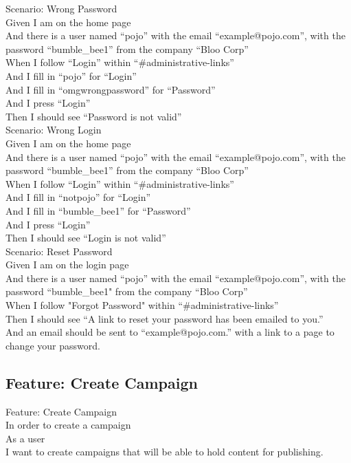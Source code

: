 \documentclass[12pt]{article}
\begin{document}
Scenario: Wrong Password \\
  Given I am on the home page \\
  And there is a user named ``pojo'' with the email ``example@pojo.com'', with the password ``bumble\_bee1'' from the company ``Bloo Corp'' \\
  When I follow ``Login'' within ``\#administrative-links'' \\
  And I fill in ``pojo'' for ``Login'' \\
  And I fill in ``omgwrongpassword'' for ``Password'' \\
  And I press ``Login'' \\
  Then I should see ``Password is not valid'' \\

Scenario: Wrong Login \\
  Given I am on the home page \\
  And there is a user named ``pojo'' with the email ``example@pojo.com'', with the password ``bumble\_bee1'' from the company ``Bloo Corp'' \\
  When I follow ``Login'' within ``\#administrative-links'' \\
  And I fill in ``notpojo'' for ``Login'' \\
  And I fill in ``bumble\_bee1'' for ``Password'' \\
  And I press ``Login'' \\
  Then I should see ``Login is not valid'' \\

Scenario: Reset Password \\
  Given I am on the login page \\
  And there is a user named ``pojo'' with the email ``example@pojo.com'', with the password ``bumble\_bee1" from the company ``Bloo Corp'' \\
  When I follow "Forgot Password" within ``\#administrative-links'' \\
  Then I should see ``A link to reset your password has been emailed to you.'' \\
  And an email should be sent to ``example@pojo.com.'' with a link to a page to change your password. \\

\subsection{Feature: Create Campaign}

Feature: Create Campaign \\
  In order to create a campaign \\
  As a user \\
  I want to create campaigns that will be able to hold content for publishing. \\
  
\end{document}
